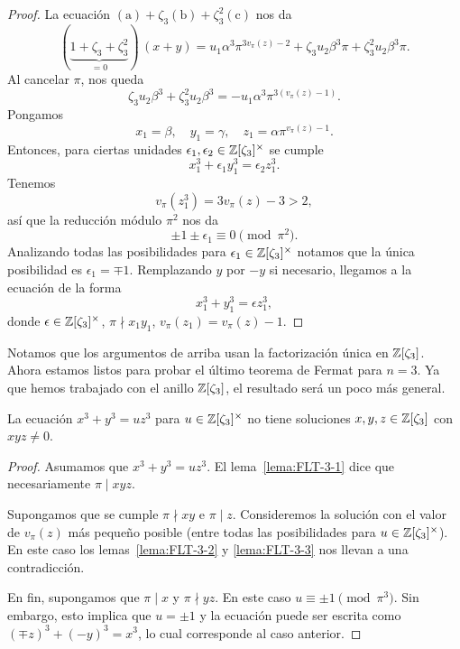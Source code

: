 \begin{lema}[Descenso]
\begin{proof}
    La ecuación $\mathrm{(a)} + \zeta_3 \mathrm{(b)} + \zeta_3^2 \mathrm{(c)}$
    nos da
    \[ (\underbrace{1 + \zeta_3 + \zeta_3^2}_{=0})\,(x + y)
           = u_1 \alpha^3 \pi^{3 v_\pi (z) - 2}
                 + \zeta_3 u_2 \beta^3 \pi
                 + \zeta_3^2 u_2 \beta^3 \pi. \]
    Al cancelar $\pi$, nos queda
    \[ \zeta_3 u_2 \beta^3 + \zeta_3^2 u_2 \beta^3
           = -u_1 \alpha^3 \pi^{3 (v_\pi (z) - 1)}. \]
    Pongamos
    $$x_1 = \beta, \quad y_1 = \gamma, \quad z_1 = \alpha \pi^{v_\pi (z) - 1}.$$
    Entonces, para ciertas unidades
    $\epsilon_1, \epsilon_2 \in \mathbb{Z}[\zeta_3]^\times$ se cumple
    $$x_1^3 + \epsilon_1 y_1^3 = \epsilon_2 z_1^3.$$
    Tenemos
    $$v_\pi (z_1^3) = 3 v_\pi (z) - 3 > 2,$$
    así que la reducción módulo $\pi^2$ nos da
    $$\pm 1 \pm \epsilon_1 \equiv 0 \pmod{\pi^2}.$$
    Analizando todas las posibilidades para
    $\epsilon_1 \in \mathbb{Z} [\zeta_3]^\times$ notamos que la única posibilidad es
    $\epsilon_1 = \mp 1$. Remplazando $y$ por $-y$ si necesario, llegamos a la
    ecuación de la forma
    $$x_1^3 + y_1^3 = \epsilon z_1^3,$$
    donde $\epsilon \in \mathbb{Z} [\zeta_3]^\times$, $\pi \nmid x_1 y_1$,
    $v_\pi (z_1) = v_\pi (z) - 1$.
\end{proof}
\end{lema}

Notamos que los argumentos de arriba usan la factorización única en
$\mathbb{Z} [\zeta_3]$. Ahora estamos listos para probar el último teorema de Fermat
para $n = 3$. Ya que hemos trabajado con el anillo $\mathbb{Z} [\zeta_3]$,
el resultado será un poco más general.

\begin{teorema}
  La ecuación $x^3 + y^3 = uz^3$ para $u \in \mathbb{Z} [\zeta_3]^\times$ no tiene
  soluciones $x,y,z \in \mathbb{Z} [\zeta_3]$ con $xyz \ne 0$.

  \begin{proof}
    Asumamos que $x^3 + y^3 = uz^3$. El lema~\ref{lema:FLT-3-1} dice que
    necesariamente $\pi \mid xyz$.

    Supongamos que se cumple $\pi \nmid xy$ e $\pi \mid z$. Consideremos la
    solución con el valor de $v_\pi (z)$ más pequeño posible (entre todas las
    posibilidades para $u \in \mathbb{Z} [\zeta_3]^\times$). En este caso los
    lemas~\ref{lema:FLT-3-2} y \ref{lema:FLT-3-3} nos llevan a una
    contradicción.

    En fin, supongamos que $\pi \mid x$ y $\pi \nmid yz$. En este caso
    $u \equiv \pm 1 \pmod{\pi^3}$. Sin embargo, esto implica que $u = \pm 1$ y
    la ecuación puede ser escrita como $(\mp z)^3 + (-y)^3 = x^3$, lo cual
    corresponde al caso anterior.
  \end{proof}
\end{teorema}

